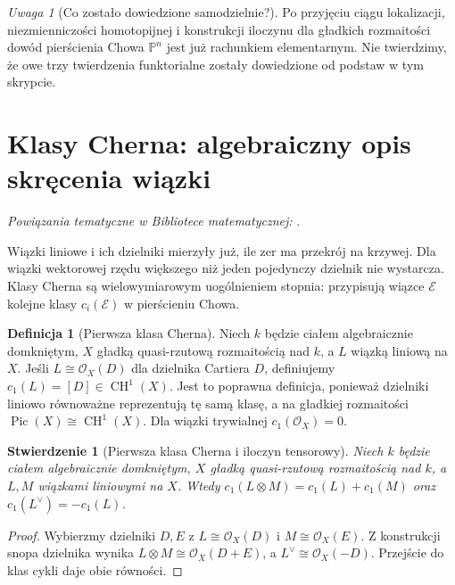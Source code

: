\documentclass[11pt,a4paper,openany]{report}
\numberwithin{equation}{section}
\theoremstyle{plain}
\newtheorem{stwierdzenie}[twierdzenie]{Stwierdzenie}
\theoremstyle{definition}
\newtheorem{definicja}[twierdzenie]{Definicja}
\theoremstyle{remark}
\newtheorem{uwaga}[twierdzenie]{Uwaga}
\newcommand{\PP}{\mathbb P}
\begin{document}
\begin{uwaga}[Co zostało dowiedzione samodzielnie?]
Po przyjęciu ciągu lokalizacji, niezmienniczości
homotopijnej i konstrukcji iloczynu dla gładkich
rozmaitości dowód pierścienia Chowa $\PP^n$ jest
już rachunkiem elementarnym. Nie twierdzimy, że
owe trzy twierdzenia funktorialne zostały dowiedzione
od podstaw w tym skrypcie.
\end{uwaga}

\section{Klasy Cherna: algebraiczny opis skręcenia wiązki}
\label{sec:ga7-chern}

\noindent\emph{Powiązania tematyczne w Bibliotece matematycznej:} .


Wiązki liniowe i ich dzielniki mierzyły już, ile zer
ma przekrój na krzywej. Dla wiązki wektorowej rzędu
większego niż jeden pojedynczy dzielnik nie wystarcza.
Klasy Cherna są wielowymiarowym uogólnieniem stopnia:
przypisują wiązce $\mathcal E$ kolejne klasy
$c_i(\mathcal E)$ w pierścieniu Chowa.

\begin{definicja}[Pierwsza klasa Cherna]
\label{def:ga7-c1}
Niech $k$ będzie ciałem algebraicznie domkniętym,
$X$ gładką quasi-rzutową rozmaitością nad $k$,
a $L$ wiązką liniową na $X$. Jeśli $L\cong\mathcal O_X(D)$
dla dzielnika Cartiera $D$, definiujemy
$c_1(L)=[D]\in\operatorname{CH}^1(X)$.
Jest to poprawna definicja, ponieważ dzielniki liniowo
równoważne reprezentują tę samą klasę, a na gładkiej
rozmaitości $\operatorname{Pic}(X)\cong\operatorname{CH}^1(X)$.
Dla wiązki trywialnej $c_1(\mathcal O_X)=0$.
\end{definicja}

\begin{stwierdzenie}[Pierwsza klasa Cherna i iloczyn tensorowy]
\label{st:ga7-c1-add}
Niech $k$ będzie ciałem algebraicznie domkniętym,
$X$ gładką quasi-rzutową rozmaitością nad $k$,
a $L,M$ wiązkami liniowymi na $X$. Wtedy
$c_1(L\otimes M)=c_1(L)+c_1(M)$ oraz
$c_1(L^\vee)=-c_1(L)$.
\end{stwierdzenie}
\begin{proof}
Wybierzmy dzielniki $D,E$ z $L\cong\mathcal O_X(D)$
i $M\cong\mathcal O_X(E)$. Z konstrukcji snopa dzielnika
wynika $L\otimes M\cong\mathcal O_X(D+E)$, a
$L^\vee\cong\mathcal O_X(-D)$.
Przejście do klas cykli daje obie równości.
\end{proof}
\end{document}
